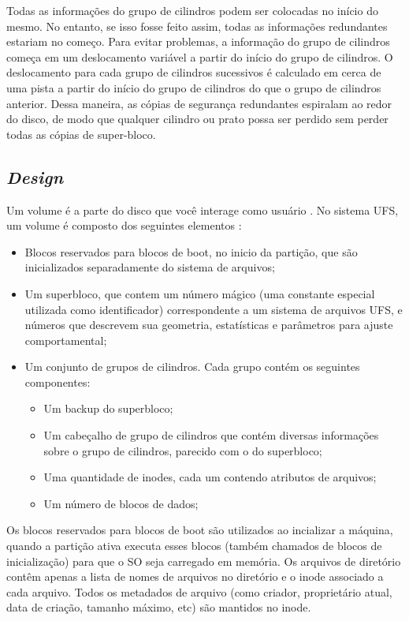 Todas as informações do grupo de cilindros podem ser colocadas no início do mesmo. No entanto, se isso fosse feito assim, todas as informações redundantes estariam no começo. Para evitar problemas, a informação do grupo de cilindros começa em um deslocamento variável a partir do início do grupo de cilindros. O deslocamento para cada grupo de cilindros sucessivos é calculado em cerca de uma pista a partir do início do grupo de cilindros do que o grupo de cilindros anterior. Dessa maneira, as cópias de segurança redundantes espiralam ao redor do disco, de modo que qualquer cilindro ou prato possa ser perdido sem perder todas as cópias de super-bloco.

\subsection{\textit{Design}}

Um volume é a parte do disco que você interage como usuário \cite{volume2018mte}. No sistema UFS, um volume é composto dos seguintes elementos \cite{wikipedia2019ufs}: 

\begin{itemize}
    \item Blocos reservados para blocos de boot, no inicio da partição, que são inicializados separadamente do sistema de arquivos;
    \item Um superbloco, que contem um número mágico (uma constante especial utilizada como identificador) correspondente a um sistema de arquivos UFS, e números que descrevem sua geometria, estatísticas e parâmetros para ajuste comportamental;
    \item Um conjunto de grupos de cilindros. Cada grupo contém os seguintes componentes:
        \begin{itemize}
            \item Um backup do superbloco;
            \item Um cabeçalho de grupo de cilindros que contém diversas informações sobre o grupo de cilindros, parecido com o do superbloco;
            \item Uma quantidade de inodes, cada um contendo atributos de arquivos;
            \item Um número de blocos de dados;
        \end{itemize}{}
\end{itemize}{}

Os blocos reservados para blocos de boot são utilizados ao incializar a máquina, quando a partição ativa executa esses blocos (também chamados de blocos de inicialização) para que o SO seja carregado em memória.
Os arquivos de diretório contêm apenas a lista de nomes de arquivos no diretório e o inode associado a cada arquivo. Todos os metadados de arquivo (como criador, proprietário atual, data de criação, tamanho máximo, etc) são mantidos no inode.

